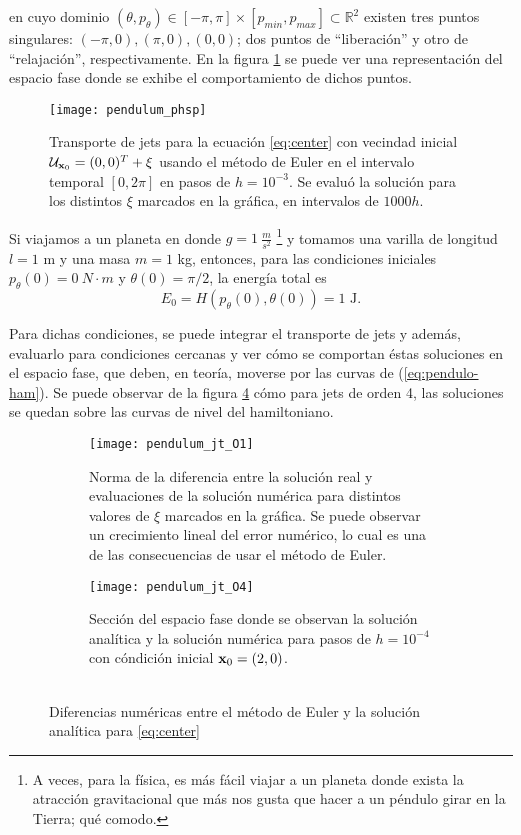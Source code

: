 en cuyo dominio $(\theta,p_{\theta}) \in [-\pi,\pi]\times[p_{min},p_{max}] \subset \mathbb{R}^2$ existen tres puntos singulares: $(-\pi,0),(\pi,0), (0,0)$; dos puntos de ``liberación'' y otro de ``relajación'', respectivamente. En la figura \ref{fig:pendulum_pshp} se puede ver una representación del espacio fase donde se exhibe el comportamiento de dichos puntos.

\begin{figure}[h!]
 \centering
 \texttt{[image: pendulum\_phsp]}
 \caption{Transporte de jets para la ecuación \ref{eq:center} con vecindad inicial $\mathcal{U}_{\mathbf{x}_0} = (0,0)^T + \xi$ usando el método de Euler en el intervalo temporal $[0,2\pi]$ en pasos de $h=10^{-3}$. Se evaluó la solución para los distintos $\xi$ marcados en la gráfica, en intervalos de $1000h$.}
\label{fig:pendulum_pshp}
\end{figure}

Si viajamos a un planeta en donde $g = 1 \ \frac{m}{s^2}$ \footnote{A veces, para la física, es más fácil viajar a un planeta donde exista la atracción gravitacional que más nos gusta que hacer a un péndulo girar en la Tierra; qué comodo.} y tomamos una varilla de longitud $l=1$ m y una masa $m=1$ kg,  entonces, para las condiciones iniciales $p_{\theta}(0) = 0 \ N \cdot m$ y $\theta(0) = \pi/2$, la energía total es 
\begin{equation*}
E_0 = H(p_{\theta}(0),\theta (0) ) = 1 \text{ J.}
\end{equation*}

Para dichas condiciones, se puede integrar el transporte de jets y además, evaluarlo para condiciones cercanas y ver cómo se comportan éstas soluciones en el espacio fase, que deben, en teoría, moverse por las curvas de (\ref{eq:pendulo-ham}). Se puede observar de la figura \ref{fig:pendulum_jt} cómo para jets de orden 4, las soluciones se quedan sobre las curvas de nivel del hamiltoniano.

\begin{figure}[h!]
\centering
\begin{subfigure}{0.49\textwidth}
	\centering
	\texttt{[image: pendulum\_jt\_O1]}
	\caption{Norma de la diferencia entre la solución real y evaluaciones de la solución numérica para distintos valores de $\xi$ marcados en la gráfica. Se puede observar un crecimiento lineal del error numérico, lo cual es una de las consecuencias de usar el método de Euler.}
	\label{fig:pendulum_jt_O1}
\end{subfigure}
%
\begin{subfigure}{0.49\textwidth}
	\centering
	\texttt{[image: pendulum\_jt\_O4]}
	\caption{Sección del espacio fase donde se observan la solución analítica y la solución numérica para pasos de $h=10^{-4}$ con cóndición inicial $\mathbf{x}_0 = (2,0)$. \\ \\}
	\label{fig:pendulum_jt_O4}
\end{subfigure}
\caption{Diferencias numéricas entre el método de Euler y la solución analítica para \ref{eq:center}}
\label{fig:pendulum_jt}
\end{figure}

